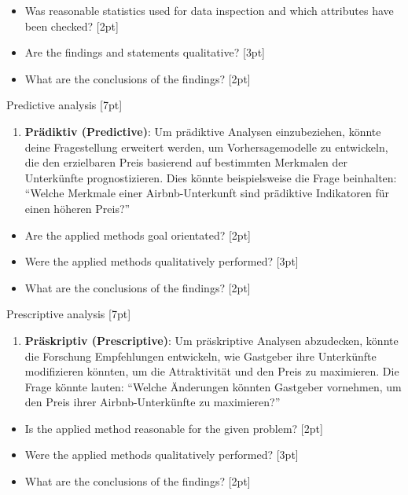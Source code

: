 \documentclass[
  journal,
]{IEEEtran}%
\providecommand{\tightlist}{%
  \setlength{\itemsep}{0pt}\setlength{\parskip}{0pt}}\usepackage{longtable,booktabs,array}
\begin{document}
\begin{itemize}
\item
  Was reasonable statistics used for data inspection and which
  attributes have been checked? {[}2pt{]}
\item
  Are the findings and statements qualitative? {[}3pt{]}
\item
  What are the conclusions of the findings? {[}2pt{]}
\end{itemize}

Predictive analysis {[}7pt{]}

\begin{enumerate}
\def\labelenumi{\arabic{enumi}.}
\tightlist
\item
  \textbf{Prädiktiv (Predictive)}: Um prädiktive Analysen einzubeziehen,
  könnte deine Fragestellung erweitert werden, um Vorhersagemodelle zu
  entwickeln, die den erzielbaren Preis basierend auf bestimmten
  Merkmalen der Unterkünfte prognostizieren. Dies könnte beispielsweise
  die Frage beinhalten: ``Welche Merkmale einer Airbnb-Unterkunft sind
  prädiktive Indikatoren für einen höheren Preis?''
\end{enumerate}

\begin{itemize}
\item
  Are the applied methods goal orientated? {[}2pt{]}
\item
  Were the applied methods qualitatively performed? {[}3pt{]}
\item
  What are the conclusions of the findings? {[}2pt{]}
\end{itemize}

Prescriptive analysis {[}7pt{]}

\begin{enumerate}
\def\labelenumi{\arabic{enumi}.}
\tightlist
\item
  \textbf{Präskriptiv (Prescriptive)}: Um präskriptive Analysen
  abzudecken, könnte die Forschung Empfehlungen entwickeln, wie
  Gastgeber ihre Unterkünfte modifizieren könnten, um die Attraktivität
  und den Preis zu maximieren. Die Frage könnte lauten: ``Welche
  Änderungen könnten Gastgeber vornehmen, um den Preis ihrer
  Airbnb-Unterkünfte zu maximieren?''
\end{enumerate}

\begin{itemize}
\item
  Is the applied method reasonable for the given problem? {[}2pt{]}
\item
  Were the applied methods qualitatively performed? {[}3pt{]}
\item
  What are the conclusions of the findings? {[}2pt{]}
\end{itemize}
\end{document}
